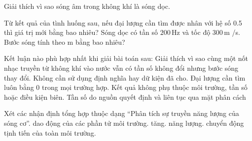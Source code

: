 \begin{ex}
Giải thích vì sao sóng âm trong không khí là sóng dọc.
\choiceTF

\end{ex}

\begin{ex}
Từ kết quả của tình huống sau, nếu đại lượng cần tìm được nhân với hệ số 0.5 thì giá trị mới bằng bao nhiêu? Sóng dọc có tần số $200\,\text{Hz}$ và tốc độ $300\,\text{m}$ /s. Bước sóng tính theo m bằng bao nhiêu?
\end{ex}

\begin{ex}
Kết luận nào phù hợp nhất khi giải bài toán sau: Giải thích vì sao cùng một nốt nhạc truyền từ không khí vào nước vẫn có tần số không đổi nhưng bước sóng thay đổi.
\choice
{Không cần sử dụng định nghĩa hay dữ kiện đã cho.}
{Đại lượng cần tìm luôn bằng 0 trong mọi trường hợp.}
{Kết quả không phụ thuộc môi trường, tần số hoặc điều kiện biên.}
{\True Tần số do nguồn quyết định và liên tục qua mặt phân cách}
\end{ex}

\begin{ex}
Xét các nhận định tổng hợp thuộc dạng “Phân tích sự truyền năng lượng của sóng cơ”.
\choiceTF
{\True dao động của các phần tử môi trường.}
{\True tăng.}
{\True năng lượng.}
{chuyển động tịnh tiến của toàn môi trường.}
\end{ex}

